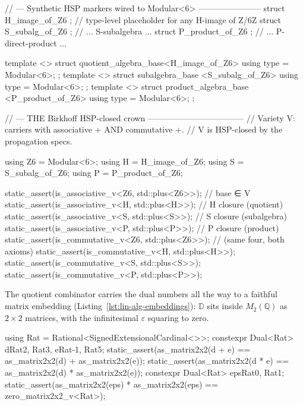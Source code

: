 \documentclass[11pt, a4paper]{article}
\begin{document}
\begin{listing}[ht]
\caption{Birkhoff's HSP closure typed.  Base $\mathbb{Z}/6\mathbb{Z}$ + three synthetic HSP markers wired to the carrier-side registries; the trait propagation lifts both axioms of the variety uniformly to all three HSP-derived carriers.  Any future H/S/P construction over $\mathbb{Z}/6\mathbb{Z}$ (or any other base in the variety) follows the same one-line opt-in pattern.}
\label{lst:hsp-closed}
\begin{cpp}
// --- Synthetic HSP markers wired to Modular<6> -----------------------
struct H_image_of_Z6 {};   // type-level placeholder for any H-image of Z/6Z
struct S_subalg_of_Z6 {};  // ... S-subalgebra ...
struct P_product_of_Z6 {}; // ... P-direct-product ...

template <> struct quotient_algebra_base<H_image_of_Z6> { using type = Modular<6>; };
template <> struct subalgebra_base      <S_subalg_of_Z6> { using type = Modular<6>; };
template <> struct product_algebra_base <P_product_of_Z6>{ using type = Modular<6>; };

// --- THE Birkhoff HSP-closed crown -----------------------------------
// Variety V: carriers with associative + AND commutative +.
// V is HSP-closed by the propagation specs.

using Z6 = Modular<6>;  using H = H_image_of_Z6;
using S  = S_subalg_of_Z6;  using P = P_product_of_Z6;

static_assert(is_associative_v<Z6, std::plus<Z6>>);  // base ∈ V
static_assert(is_associative_v<H,  std::plus<H>>);   // H closure (quotient)
static_assert(is_associative_v<S,  std::plus<S>>);   // S closure (subalgebra)
static_assert(is_associative_v<P,  std::plus<P>>);   // P closure (product)
static_assert(is_commutative_v<Z6, std::plus<Z6>>);  // (same four, both axioms)
static_assert(is_commutative_v<H,  std::plus<H>>);
static_assert(is_commutative_v<S,  std::plus<S>>);
static_assert(is_commutative_v<P,  std::plus<P>>);
\end{cpp}
\end{listing}

The quotient combinator carries the dual numbers all the way to a faithful matrix embedding (Listing~\ref{lst:lin-alg-embeddings}): $\mathbb{D}$ sits inside $M_2(\mathbb{Q})$ as $2\times2$ matrices, with the infinitesimal $\varepsilon$ squaring to zero.

\begin{listing}[htbp]
\caption{Dual numbers embed faithfully as $2 \times 2$ matrices over $\mathbb{Q}$, with the infinitesimal squaring to zero.}
\label{lst:lin-alg-embeddings}
\begin{cpp}
using Rat = Rational<SignedExtensionalCardinal<>>;
constexpr Dual<Rat> d{Rat{2}, Rat{3}}, e{Rat{-1}, Rat{5}};
static_assert(as_matrix2x2(d + e) == as_matrix2x2(d) + as_matrix2x2(e));
static_assert(as_matrix2x2(d * e) == as_matrix2x2(d) * as_matrix2x2(e));
constexpr Dual<Rat> eps{Rat{0}, Rat{1}};
static_assert(as_matrix2x2(eps) * as_matrix2x2(eps) == zero_matrix2x2_v<Rat>);
\end{cpp}
\end{listing}
\end{document}

